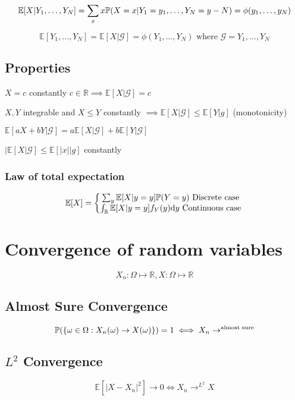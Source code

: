 $$
\mathbb{E}[X|Y_1,\dots,Y_N]=\sum_x x\mathbb{P}(X=x|Y_1=y_1,\dots,Y_N=y-N)=\phi(y_1,\dots,y_N)
$$

$$
\mathbb{E}[Y_1,\dots,Y_N]=\mathbb{E}[X|\mathcal{G}]=\phi(Y_1,\dots,Y_N)\text{ where }\mathcal{G}=Y_1,\dots,Y_N
$$

\subsection{Properties}

$X=c$ constantly $c\in\mathbb{R}\implies \mathbb{E}[X|\mathcal{G}]=c$

$X,Y$ integrable and $X\leq Y$ constantly $\implies\mathbb{E}[X|\mathcal{G}]\leq\mathbb{E}[Y|g]$ (monotonicity)

$\mathbb{E}[aX+bY|\mathcal{G}]=a\mathbb{E}[X|\mathcal{G}]+b\mathbb{E}[Y|\mathcal{G}]$

$|\mathbb{E}[X|\mathcal{G}]\leq\mathbb{E}[|x||g]$ constantly

\subsubsection{Law of total expectation}
$$
\mathbb{E}[X]=
\bigg\{
\begin{matrix}
\sum_y \mathbb{E}[X|y=y]\mathbb{P}(Y=y) \text{ Discrete case }
\\
\int_{\mathbb{R}}\mathbb{E}[X|y=y]f_Y(y)\text{d}y \text{ Continuous case }
\end{matrix}
$$

\section{Convergence of random variables}

$$
X_n:\Omega\mapsto \mathbb{R},
X:\Omega\mapsto \mathbb{R}
$$

\subsection{Almost Sure Convergence}

$$
\mathbb{P}(\{\omega\in\Omega:X_n(\omega)\rightarrow X(\omega)\})=1
\iff
X_n \rightarrow^{\text{almost sure}}
$$

\subsection{$L^2$ Convergence}

$$
\mathbb{E}[|X-X_n|^2]\rightarrow 0
\iff X_n\rightarrow^{L^2}X
$$

